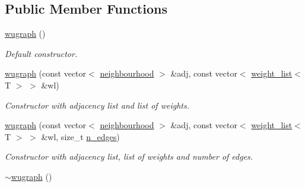 \subsection*{Public Member Functions}
\begin{DoxyCompactItemize}
\item 
\hypertarget{classlgraph_1_1utils_1_1wugraph_ae50a66b351ad581b460097ef43565cc2}{\hyperlink{classlgraph_1_1utils_1_1wugraph_ae50a66b351ad581b460097ef43565cc2}{wugraph} ()}\label{classlgraph_1_1utils_1_1wugraph_ae50a66b351ad581b460097ef43565cc2}

\begin{DoxyCompactList}\small\item\em Default constructor. \end{DoxyCompactList}\item 
\hyperlink{classlgraph_1_1utils_1_1wugraph_a8293284942bab59033ffe49d22c96065}{wugraph} (const vector$<$ \hyperlink{namespacelgraph_1_1utils_a0f2ef47028a466d26841709e705390ac}{neighbourhood} $>$ \&adj, const vector$<$ \hyperlink{namespacelgraph_1_1utils_a11e7963f3637ea13778b8d3e69d2c17f}{weight\-\_\-list}$<$ T $>$ $>$ \&wl)
\begin{DoxyCompactList}\small\item\em Constructor with adjacency list and list of weights. \end{DoxyCompactList}\item 
\hyperlink{classlgraph_1_1utils_1_1wugraph_aa01eae27fd8116710c86f7e15449f5fe}{wugraph} (const vector$<$ \hyperlink{namespacelgraph_1_1utils_a0f2ef47028a466d26841709e705390ac}{neighbourhood} $>$ \&adj, const vector$<$ \hyperlink{namespacelgraph_1_1utils_a11e7963f3637ea13778b8d3e69d2c17f}{weight\-\_\-list}$<$ T $>$ $>$ \&wl, size\-\_\-t \hyperlink{classlgraph_1_1utils_1_1xxgraph_af3f7c3835406c2cbf70479ae1c0253c9}{n\-\_\-edges})
\begin{DoxyCompactList}\small\item\em Constructor with adjacency list, list of weights and number of edges. \end{DoxyCompactList}\item 
\hypertarget{classlgraph_1_1utils_1_1wugraph_a4e6ac08876defdc33d4ed8f5b1826384}{\hyperlink{classlgraph_1_1utils_1_1wugraph_a4e6ac08876defdc33d4ed8f5b1826384}{$\sim$wugraph} ()}\label{classlgraph_1_1utils_1_1wugraph_a4e6ac08876defdc33d4ed8f5b1826384}


\end{DoxyCompactItemize}

